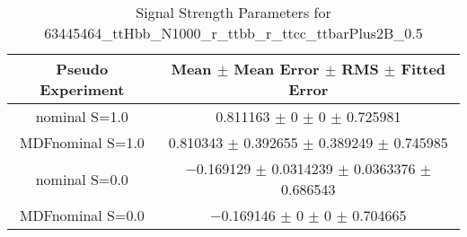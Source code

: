 \begin{table}
\centering
\caption{Signal Strength Parameters for 63445464\_ttHbb\_N1000\_r\_ttbb\_r\_ttcc\_ttbarPlus2B\_0.5}
\begin{tabular}{cc}
\toprule
Pseudo Experiment & Mean $\pm$ Mean Error $\pm$ RMS $\pm$ Fitted Error\\
\midrule
nominal S=1.0 & \num{0.811163} $\pm$ \num{0} $\pm$ \num{0} $\pm$ \num{0.725981}\\
MDFnominal S=1.0 & \num{0.810343} $\pm$ \num{0.392655} $\pm$ \num{0.389249} $\pm$ \num{0.745985}\\
nominal S=0.0 & \num{-0.169129} $\pm$ \num{0.0314239} $\pm$ \num{0.0363376} $\pm$ \num{0.686543}\\
MDFnominal S=0.0 & \num{-0.169146} $\pm$ \num{0} $\pm$ \num{0} $\pm$ \num{0.704665}\\
\bottomrule
\end{tabular}
\end{table}